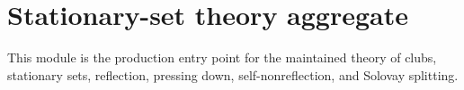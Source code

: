 \section{Stationary-set theory aggregate}







This module is the production entry point for the maintained theory of clubs,
stationary sets, reflection, pressing down, self-nonreflection, and Solovay
splitting.
